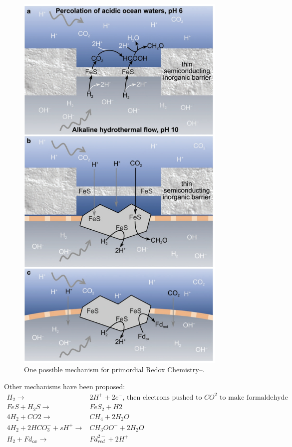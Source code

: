 \documentclass[]{article}
\begin{document}
\begin{figure}[H]
	\caption[Primordial Redox Chemistry]{One possible mechanism for primordial Redox Chemistry--\cite{sojo2016origin}. } \label{fig:PrimordialRedox} 
	\includegraphics[width=0.9\textwidth]{PrimordialRedox}
\end{figure}

Other mechanisms have been proposed:
\begin{align*}
H_2 \rightarrow & 2H^+ + 2 e^- \text{, then electrons pushed to $CO^2$ to make formaldehyde}\\
FeS + H_2 S \rightarrow &Fe S_2 +H2\\
4H_2 +CO2 \rightarrow & CH_4 + 2H_2 O\\
4H_2 + 2HCO^-_3 + sH^+\rightarrow & CH_3OO^- + 2H_2O\\
H_2 + Fd_{ox} \rightarrow & Fd^{2-}_{red} + 2H^+ 
\end{align*}
\end{document}
